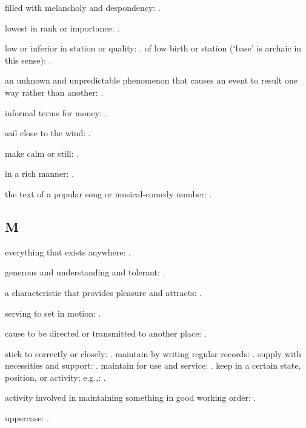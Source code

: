   filled with melancholy and despondency: .

  lowest in rank or importance: .

  low or inferior in station or quality: . of low birth or station (`base' is archaic in this sense): .

  an unknown and unpredictable phenomenon that causes an event to result one way rather than another: .

  informal terms for money: .

  sail close to the wind: .

  make calm or still: .

  in a rich manner: .

  the text of a popular song or musical-comedy number: .

\subsection*{M}

  everything that exists anywhere: .

  generous and understanding and tolerant: .

  a characteristic that provides pleasure and attracts: .

  serving to set in motion: .

  cause to be directed or transmitted to another place: .

  stick to correctly or closely: . maintain by writing regular records: . supply with necessities and support: . maintain for use and service: . keep in a certain state, position, or activity; e.g.,: .

  activity involved in maintaining something in good working order: .

  uppercase: .

